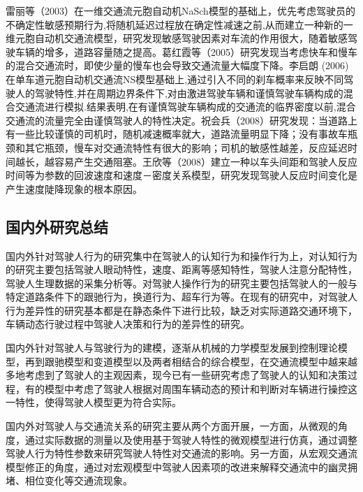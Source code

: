雷丽等（2003）在一维交通流元胞自动机NaSch模型的基础上，优先考虑驾驶员的不确定性敏感预期行为,将随机延迟过程放在确定性减速之前,从而建立一种新的一维元胞自动机交通流模型，研究发现敏感驾驶因素对车流的作用很大，随着敏感驾驶车辆的增多，道路容量随之提高\cite{雷丽2003}。葛红霞等（2005）研究发现当考虑快车和慢车的混合交通流时，即使少量的慢车也会导致交通流量大幅度下降\cite{葛红霞2005}。李启朗 (2006) 在单车道元胞自动机交通流NS模型基础上,通过引入不同的刹车概率来反映不同驾驶人的驾驶特性,并在周期边界条件下,对由激进驾驶车辆和谨慎驾驶车辆构成的混合交通流进行模拟.结果表明,在有谨慎驾驶车辆构成的交通流的临界密度以前,混合交通流的流量完全由谨慎驾驶人的特性决定\cite{李启朗2006}。祝会兵（2008）研究发现：当道路上有一些比较谨慎的司机时，随机减速概率就大，道路流量明显下降；没有事故车瓶颈和其它瓶颈，慢车对交通流特性有很大的影响；司机的敏感性越差，反应延迟时间越长，越容易产生交通阻塞\cite{祝会兵2008}。王欣等（2008）建立一种以车头间距和驾驶人反应时间等为参数的回波速度和速度－密度关系模型，研究发现驾驶人反应时间变化是产生速度陡降现象的根本原因\cite{王欣2008}。


\subsection{国内外研究总结}

国内外针对驾驶人行为的研究集中在驾驶人的认知行为和操作行为上，对认知行为的研究主要包括驾驶人眼动特性，速度、距离等感知特性，驾驶人注意分配特性，驾驶人生理数据的采集分析等。对驾驶人操作行为的研究主要包括驾驶人的一般与特定道路条件下的跟驰行为，换道行为、超车行为等。在现有的研究中，对驾驶人行为差异性的研究基本都是在静态条件下进行比较，缺乏对实际道路交通环境下，车辆动态行驶过程中驾驶人决策和行为的差异性的研究。

国内外针对驾驶人与驾驶行为的建模，逐渐从机械的力学模型发展到控制理论模型，再到跟驰模型和变道模型以及两者相结合的综合模型，在交通流模型中越来越多地考虑到了驾驶人的主观因素，现今已有一些研究考虑了驾驶人的认知和决策过程，有的模型中考虑了驾驶人根据对周围车辆动态的预计和判断对车辆进行操控这一特性，使得驾驶人模型更为符合实际。

国内外对驾驶人与交通流关系的研究主要从两个方面开展，一方面，从微观的角度，通过实际数据的测量以及使用基于驾驶人特性的微观模型进行仿真，通过调整驾驶人行为特性参数来研究驾驶人特性对交通流的影响。另一方面，从宏观交通流模型修正的角度，通过对宏观模型中驾驶人因素项的改进来解释交通流中的幽灵拥堵、相位变化等交通流现象。%

